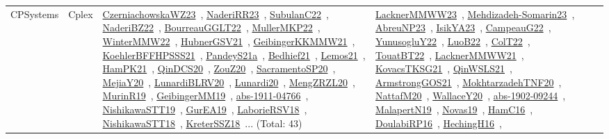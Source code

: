 {\begin{longtable}{lp{3cm}>{\raggedright\arraybackslash}p{6cm}>{\raggedright\arraybackslash}p{6cm}>{\raggedright\arraybackslash}p{8cm}}
CPSystems & Cplex & \href{works/CzerniachowskaWZ23.pdf}{CzerniachowskaWZ23}~\cite{CzerniachowskaWZ23}, \href{works/NaderiRR23.pdf}{NaderiRR23}~\cite{NaderiRR23}, \href{works/SubulanC22.pdf}{SubulanC22}~\cite{SubulanC22}, \href{works/NaderiBZ22.pdf}{NaderiBZ22}~\cite{NaderiBZ22}, \href{works/BourreauGGLT22.pdf}{BourreauGGLT22}~\cite{BourreauGGLT22}, \href{works/MullerMKP22.pdf}{MullerMKP22}~\cite{MullerMKP22}, \href{works/WinterMMW22.pdf}{WinterMMW22}~\cite{WinterMMW22}, \href{works/HubnerGSV21.pdf}{HubnerGSV21}~\cite{HubnerGSV21}, \href{works/GeibingerKKMMW21.pdf}{GeibingerKKMMW21}~\cite{GeibingerKKMMW21}, \href{works/KoehlerBFFHPSSS21.pdf}{KoehlerBFFHPSSS21}~\cite{KoehlerBFFHPSSS21}, \href{works/PandeyS21a.pdf}{PandeyS21a}~\cite{PandeyS21a}, \href{works/Bedhief21.pdf}{Bedhief21}~\cite{Bedhief21}, \href{works/Lemos21.pdf}{Lemos21}~\cite{Lemos21}, \href{works/HamPK21.pdf}{HamPK21}~\cite{HamPK21}, \href{works/QinDCS20.pdf}{QinDCS20}~\cite{QinDCS20}, \href{works/ZouZ20.pdf}{ZouZ20}~\cite{ZouZ20}, \href{works/SacramentoSP20.pdf}{SacramentoSP20}~\cite{SacramentoSP20}, \href{works/MejiaY20.pdf}{MejiaY20}~\cite{MejiaY20}, \href{works/LunardiBLRV20.pdf}{LunardiBLRV20}~\cite{LunardiBLRV20}, \href{works/Lunardi20.pdf}{Lunardi20}~\cite{Lunardi20}, \href{works/MengZRZL20.pdf}{MengZRZL20}~\cite{MengZRZL20}, \href{works/MurinR19.pdf}{MurinR19}~\cite{MurinR19}, \href{works/GeibingerMM19.pdf}{GeibingerMM19}~\cite{GeibingerMM19}, \href{works/abs-1911-04766.pdf}{abs-1911-04766}~\cite{abs-1911-04766}, \href{works/NishikawaSTT19.pdf}{NishikawaSTT19}~\cite{NishikawaSTT19}, \href{works/GurEA19.pdf}{GurEA19}~\cite{GurEA19}, \href{works/LaborieRSV18.pdf}{LaborieRSV18}~\cite{LaborieRSV18}, \href{works/NishikawaSTT18.pdf}{NishikawaSTT18}~\cite{NishikawaSTT18}, \href{works/KreterSSZ18.pdf}{KreterSSZ18}~\cite{KreterSSZ18}... (Total: 43) & \href{works/LacknerMMWW23.pdf}{LacknerMMWW23}~\cite{LacknerMMWW23}, \href{works/Mehdizadeh-Somarin23.pdf}{Mehdizadeh-Somarin23}~\cite{Mehdizadeh-Somarin23}, \href{works/AbreuNP23.pdf}{AbreuNP23}~\cite{AbreuNP23}, \href{works/IsikYA23.pdf}{IsikYA23}~\cite{IsikYA23}, \href{works/CampeauG22.pdf}{CampeauG22}~\cite{CampeauG22}, \href{works/YunusogluY22.pdf}{YunusogluY22}~\cite{YunusogluY22}, \href{works/LuoB22.pdf}{LuoB22}~\cite{LuoB22}, \href{works/ColT22.pdf}{ColT22}~\cite{ColT22}, \href{works/TouatBT22.pdf}{TouatBT22}~\cite{TouatBT22}, \href{works/LacknerMMWW21.pdf}{LacknerMMWW21}~\cite{LacknerMMWW21}, \href{works/KovacsTKSG21.pdf}{KovacsTKSG21}~\cite{KovacsTKSG21}, \href{works/QinWSLS21.pdf}{QinWSLS21}~\cite{QinWSLS21}, \href{works/ArmstrongGOS21.pdf}{ArmstrongGOS21}~\cite{ArmstrongGOS21}, \href{works/MokhtarzadehTNF20.pdf}{MokhtarzadehTNF20}~\cite{MokhtarzadehTNF20}, \href{works/NattafM20.pdf}{NattafM20}~\cite{NattafM20}, \href{works/WallaceY20.pdf}{WallaceY20}~\cite{WallaceY20}, \href{works/abs-1902-09244.pdf}{abs-1902-09244}~\cite{abs-1902-09244}, \href{works/MalapertN19.pdf}{MalapertN19}~\cite{MalapertN19}, \href{works/Novas19.pdf}{Novas19}~\cite{Novas19}, \href{works/HamC16.pdf}{HamC16}~\cite{HamC16}, \href{works/DoulabiRP16.pdf}{DoulabiRP16}~\cite{DoulabiRP16}, \href{works/HechingH16.pdf}{HechingH16}~\cite{HechingH16}, 
\end{longtable}}
